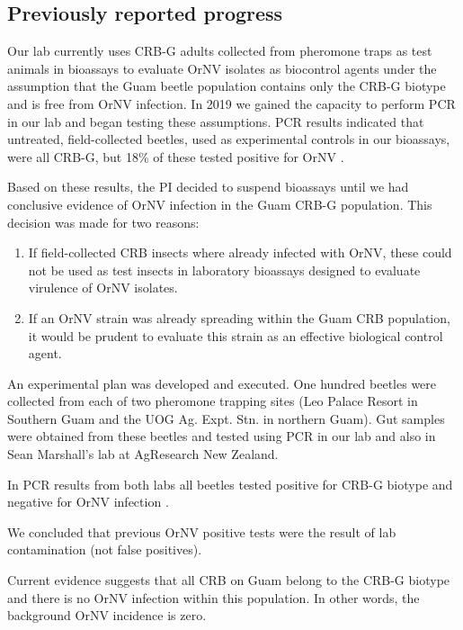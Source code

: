 \documentclass[12pt,letterpaper,english,bibliography=totocnumbered, abstract=on]{scrartcl}
\begin{document}
\subsection{Previously reported progress}

Our lab currently uses CRB-G adults collected from pheromone traps as test animals in bioassays to evaluate OrNV isolates as biocontrol agents under the assumption that the Guam beetle population contains only the CRB-G biotype and is free from OrNV infection. In 2019 we gained the capacity to perform PCR in our lab and began testing these assumptions. PCR results indicated that untreated, field-collected beetles, used as experimental controls in our bioassays, were all CRB-G, but 18\% of these tested positive for OrNV \cite{grasela_technical_2020, graselaTechnicalReportPolymerase2020, graselaTechnicalReportPolymerase2020a}.

Based on these results, the PI decided to suspend bioassays until we had conclusive evidence of OrNV infection in the Guam CRB-G population.  This decision was made for two reasons:

\begin{enumerate}
	\item If field-collected CRB insects where already infected with OrNV, these could not be used as test insects in laboratory bioassays designed to evaluate virulence of OrNV isolates.
	\item If an OrNV strain was already spreading within the Guam CRB population, it would be prudent to evaluate this strain as an effective biological control agent. 
\end{enumerate}

An experimental plan \cite{mooreExperimentalPlanDetermining2020} was developed and executed. One hundred beetles were collected from each of two pheromone trapping sites (Leo Palace Resort in Southern Guam and the UOG Ag. Expt. Stn. in northern Guam). Gut samples were obtained from these beetles and tested using PCR in our lab and also in Sean Marshall's lab at AgResearch New Zealand. 

In PCR results from both labs all beetles tested positive for CRB-G biotype and negative for OrNV infection \cite{graselaInvestigationDeterminePresence2020}. 

We concluded that previous OrNV positive tests were the result of lab contamination (not false positives). 

Current evidence suggests that all CRB on Guam belong to the CRB-G biotype and there is no OrNV infection within this population. In other words, the background OrNV incidence is zero.
\end{document}
